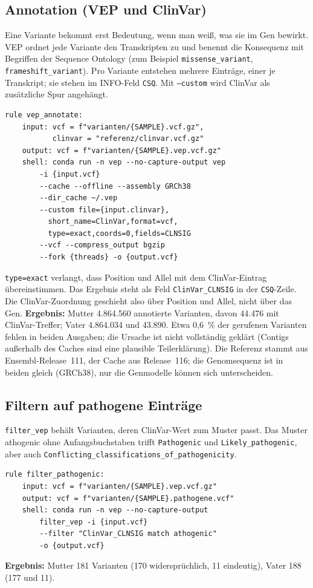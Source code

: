 \documentclass[10pt,a4paper,twocolumn]{article}
\begin{document}
\subsection{Annotation (VEP und ClinVar)}
Eine Variante bekommt erst Bedeutung, wenn man weiß, was sie im Gen bewirkt. VEP \citep{mclaren2016} ordnet jede Variante den Transkripten zu und benennt die Konsequenz mit Begriffen der Sequence Ontology (zum Beispiel \texttt{missense\_variant}, \texttt{frameshift\_variant}). Pro Variante entstehen mehrere Einträge, einer je Transkript; sie stehen im INFO-Feld \texttt{CSQ}. Mit \texttt{--custom} wird ClinVar als zusätzliche Spur angehängt.
\begin{lstlisting}
rule vep_annotate:
    input: vcf = f"varianten/{SAMPLE}.vcf.gz",
           clinvar = "referenz/clinvar.vcf.gz"
    output: vcf = f"varianten/{SAMPLE}.vep.vcf.gz"
    shell: conda run -n vep --no-capture-output vep
        -i {input.vcf}
        --cache --offline --assembly GRCh38
        --dir_cache ~/.vep
        --custom file={input.clinvar},
          short_name=ClinVar,format=vcf,
          type=exact,coords=0,fields=CLNSIG
        --vcf --compress_output bgzip
        --fork {threads} -o {output.vcf}
\end{lstlisting}
\texttt{type=exact} verlangt, dass Position und Allel mit dem ClinVar-Eintrag übereinstimmen. Das Ergebnis steht als Feld \texttt{ClinVar\_CLNSIG} in der \texttt{CSQ}-Zeile. Die ClinVar-Zuordnung geschieht also über Position und Allel, nicht über das Gen. \textbf{Ergebnis:} Mutter 4.864.560 annotierte Varianten, davon 44.476 mit ClinVar-Treffer; Vater 4.864.034 und 43.890. Etwa 0,6~\% der gerufenen Varianten fehlen in beiden Ausgaben; die Ursache ist nicht vollständig geklärt (Contigs außerhalb des Caches sind eine plausible Teilerklärung). Die Referenz stammt aus Ensembl-Release~111, der Cache aus Release~116; die Genomsequenz ist in beiden gleich (GRCh38), nur die Genmodelle können sich unterscheiden.
 
\subsection{Filtern auf pathogene Einträge}
\texttt{filter\_vep} behält Varianten, deren ClinVar-Wert zum Muster passt. Das Muster \glqq athogenic\grqq{} ohne Anfangsbuchstaben trifft \texttt{Pathogenic} und \texttt{Likely\_pathogenic}, aber auch \texttt{Conflicting\_classifications\_of\_pathogenicity}.
\begin{lstlisting}
rule filter_pathogenic:
    input: vcf = f"varianten/{SAMPLE}.vep.vcf.gz"
    output: vcf = f"varianten/{SAMPLE}.pathogene.vcf"
    shell: conda run -n vep --no-capture-output
        filter_vep -i {input.vcf}
        --filter "ClinVar_CLNSIG match athogenic"
        -o {output.vcf}
\end{lstlisting}
\textbf{Ergebnis:} Mutter 181 Varianten (170 widersprüchlich, 11 eindeutig), Vater 188 (177 und 11).
 
\end{document}

